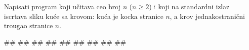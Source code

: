 \begin{Exercise}[label=p1.7_] 
Napisati program koji učitava ceo broj $n$ ($n \geq 2$) i 
koji na standardni izlaz iscrtava sliku kuće sa krovom: kuća
je kocka stranice $n$, a krov jednakostranični trougao stranice
$n$.

\begin{miditest}
\begin{upotreba}{1}
#\naslovInt#
##
#\izlaz{\ \ \ *}#
#\izlaz{\ \ *\ *}#
#\izlaz{\ *\ \ \ *}#
#\izlaz{*\ *\ *\ *}#
#\izlaz{*\ \ \ \ \ *}#
#\izlaz{*\ \ \ \ \ *}#
#\izlaz{*\ *\ *\ *}#
\end{upotreba}
\end{miditest}
\end{Exercise}
\begin{Answer}[ref=p1.7_]
\end{Answer}



